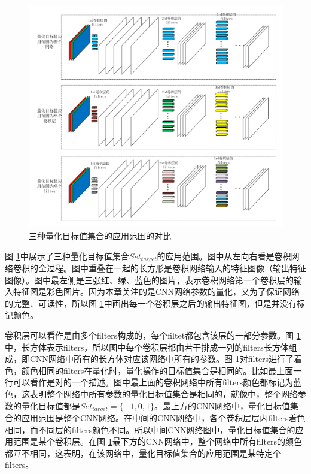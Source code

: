 \documentclass[ pdftex, oneside, master]{NJUthesis}
\begin{document}
\begin{figure}
\centering
\includegraphics[width=\textwidth]{set_range.pdf}
\caption{三种量化目标值集合的应用范围的对比}
\label{set_range}
\end{figure}

图 \ref{set_range}中展示了三种量化目标值集合$Set_{target}$的应用范围。图中从左向右看是卷积网络卷积的全过程。图中重叠在一起的长方形是卷积网络输入的特征图像（输出特征图像）。图中最左侧是三张红、绿、蓝色的图片，表示卷积网络第一个卷积层的输入特征图是彩色图片。因为本章关注的是CNN网络参数的量化，又为了保证网络的完整、可读性，所以图 \ref{set_range}中画出每一个卷积层之后的输出特征图，但是并没有标记颜色。

卷积层可以看作是由多个filters构成的，每个filtet都包含该层的一部分参数。图 \ref{set_range}中，长方体表示filters，所以图中每个卷积层都由若干排成一列的filters长方体组成，即CNN网络中所有的长方体对应该网络中所有的参数。图 \ref{set_range}对filters进行了着色，颜色相同的filters在量化时，量化操作的目标值集合是相同的。比如最上面一行可以看作是对\cite{ternary}的一个描述。图中最上面的卷积网络中所有filters颜色都标记为蓝色，这表明整个网络中所有参数的量化目标值集合是相同的，就像\cite{ternary}中，整个网络参数的量化目标值都是$Set_{target} = \{-1, 0, 1\}$。最上方的CNN网络中，量化目标值集合的应用范围是整个CNN网络。在中间的CNN网络中，各个卷积层层内filters着色相同，而不同层的filters颜色不同。所以中间CNN网络图中，量化目标值集合的应用范围是某个卷积层。在图 \ref{set_range}最下方的CNN网络中，整个网络中所有filters的颜色都互不相同，这表明，在该网络中，量化目标值集合的应用范围是某特定个filters。
\end{document}
